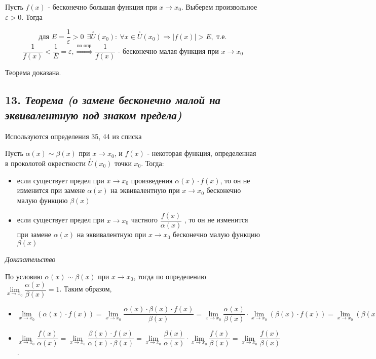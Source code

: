 Пусть $f(x)$ - бесконечно большая функция при $x \rightarrow x_0$. Выберем произвольное ${\varepsilon} > 0$. Тогда

$$
\text{для } E = \dfrac{1}{{\varepsilon}} > 0 \ \ \exists \overset{\circ}U(x_0): \ \forall x \in \overset{\circ}U(x_0) \Rightarrow |f(x)| > E, \text{ т.е.}
$$ $$
\dfrac{1}{f(x)} < \dfrac{1}{E} = {\varepsilon}, \overset{\text{по опр.}}\Rightarrow \dfrac{1}{f(x)} \text{ - бесконечно малая функция при } x \rightarrow x_0 
$$

Теорема доказана.
\newpage 
\subsection*{13. \textit{Теорема (о замене бесконечно малой на эквивалентную под знаком предела)}}
\begin{Quote2} 
\small\centering 

Используются определения 35, 44 из списка \end{Quote2} 

Пусть $\alpha(x)\sim\beta(x)$ при $x \rightarrow x_0$, и $f(x)$ - некоторая функция, определенная в проколотой окрестности $\overset{\circ}U(x_0)$ точки $x_0$. Тогда:
\begin{itemize}

\item если существует предел при $x \rightarrow x_0$ произведения $\alpha(x)\cdot f(x)$, то он не изменится при замене $\alpha(x)$ на эквивалентную при $x \rightarrow x_0$ бесконечно малую функцию $\beta(x)$
\item если существует предел при $x \rightarrow x_0$ частного ${\dfrac{f(x)}{\alpha(x)}}$ , то он не изменится при замене $\alpha(x)$ на эквивалентную при $x \rightarrow x_0$ бесконечно малую функцию $\beta(x)$

\end{itemize}
\vspace*{20pt} 

\textit{Доказательство}

По условию $\alpha(x)\sim\beta(x)$ при $x \rightarrow x_0$, тогда по определению $\lim\limits_{x \to x_0}{\dfrac{\alpha(x)}{\beta(x)}} = 1$. Таким образом,
\begin{itemize}

\item $\lim\limits_{x \to x_0}(\alpha(x)\cdot f(x)) = \lim\limits_{x \to x_0}{\dfrac{\alpha(x)\cdot\beta(x)\cdot f(x)}{\beta(x)}} = \lim\limits_{x \to x_0}{\dfrac{\alpha(x)}{\beta(x)}}\cdot\lim\limits_{x \to x_0}(\beta(x)\cdot f(x)) = \lim\limits_{x \to x_0}(\beta(x)\cdot f(x))$
\item $\lim\limits_{x \to x_0}{\dfrac{f(x)}{\alpha(x)}} = \lim\limits_{x \to x_0}{\dfrac{\beta(x)\cdot f(x)}{\alpha(x)\cdot\beta(x)}} = \lim\limits_{x \to x_0}{\dfrac{\beta(x)}{\alpha(x)}}\cdot\lim\limits_{x \to x_0}{\dfrac{f(x)}{\beta(x)}} = \lim\limits_{x \to x_0}{\dfrac{f(x)}{\beta(x)}}$.

\end{itemize}

